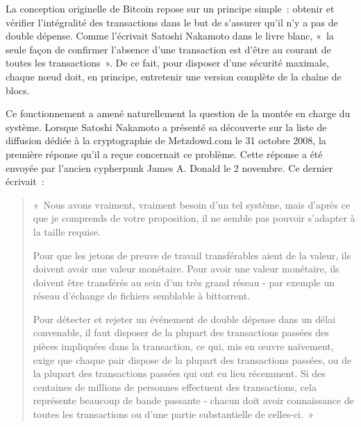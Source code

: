 La conception originelle de Bitcoin repose sur un principe simple~: obtenir et vérifier l'intégralité des transactions dans le but de s'assurer qu'il n'y a pas de double dépense. Comme l'écrivait Satoshi Nakamoto dans le livre blanc, «~la seule façon de confirmer l'absence d'une transaction est d'être au courant de toutes les transactions~». De ce fait, pour disposer d'une sécurité maximale, chaque nœud doit, en principe, entretenir une version complète de la chaîne de blocs.

Ce fonctionnement a amené naturellement la question de la montée en charge du système. Lorsque Satoshi Nakamoto a présenté sa découverte sur la liste de diffusion dédiée à la cryptographie de Metzdowd.com le 31 octobre 2008, la première réponse qu'il a reçue concernait ce problème. Cette réponse a été envoyée par l'ancien cypherpunk James A. Donald le 2 novembre. Ce dernier écrivait~:

\begin{quote}
«~Nous avons vraiment, vraiment besoin d'un tel système, mais d'après ce que je comprends de votre proposition, il ne semble pas pouvoir s'adapter à la taille requise.

Pour que les jetons de preuve de travail transférables aient de la valeur, ils doivent avoir une valeur monétaire. Pour avoir une valeur monétaire, ils doivent être transférés au sein d'un très grand réseau - par exemple un réseau d'échange de fichiers semblable à bittorrent.

Pour détecter et rejeter un événement de double dépense dans un délai convenable, il faut disposer de la plupart des transactions passées des pièces impliquées dans la transaction, ce qui, mis en œuvre naïvement, exige que chaque pair dispose de la plupart des transactions passées, ou de la plupart des transactions passées qui ont eu lieu récemment. Si des centaines de millions de personnes effectuent des transactions, cela représente beaucoup de bande passante - chacun doit avoir connaissance de toutes les transactions ou d'une partie substantielle de celles-ci.~»
\end{quote} %
%
%

